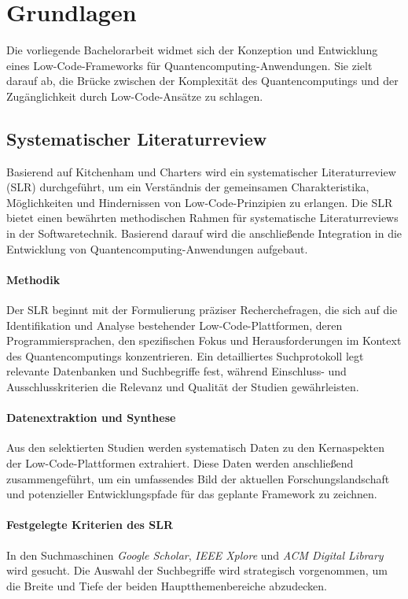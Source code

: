 \section{Grundlagen}
Die vorliegende Bachelorarbeit widmet sich der Konzeption und Entwicklung eines 
Low-Code-Frameworks für Quantencomputing-Anwendungen. Sie zielt darauf ab, die 
Brücke zwischen der Komplexität des Quantencomputings und der Zugänglichkeit durch 
Low-Code-Ansätze zu schlagen. 

\subsection{Systematischer Literaturreview}
Basierend auf Kitchenham und Charters \cite{kitchenham2007guidelines} wird ein systematischer 
Literaturreview (SLR) durchgeführt, um ein Verständnis der gemeinsamen Charakteristika, Möglichkeiten 
und Hindernissen von Low-Code-Prinzipien zu erlangen. Die SLR bietet einen bewährten methodischen 
Rahmen für systematische Literaturreviews in der Softwaretechnik. Basierend darauf wird die 
anschließende Integration in die Entwicklung von Quantencomputing-Anwendungen aufgebaut.

\paragraph{Methodik}
Der SLR beginnt mit der Formulierung präziser Recherchefragen, die sich auf die 
Identifikation und Analyse bestehender Low-Code-Plattformen, deren Programmiersprachen, 
den spezifischen Fokus und Herausforderungen im Kontext des Quantencomputings 
konzentrieren. Ein detailliertes Suchprotokoll legt relevante Datenbanken und 
Suchbegriffe fest, während Einschluss- und Ausschlusskriterien die Relevanz und Qualität 
der Studien gewährleisten.

\paragraph{Datenextraktion und Synthese}
Aus den selektierten Studien werden systematisch Daten zu den Kernaspekten der 
Low-Code-Plattformen extrahiert. Diese Daten werden anschließend zusammengeführt, um ein 
umfassendes Bild der aktuellen Forschungslandschaft und potenzieller Entwicklungspfade für 
das geplante Framework zu zeichnen.

\paragraph{Festgelegte Kriterien des SLR}
In den Suchmaschinen \textit{Google Scholar}, \textit{IEEE Xplore} und \textit{ACM Digital Library} 
wird gesucht. Die Auswahl der Suchbegriffe wird strategisch vorgenommen, um die Breite und Tiefe der beiden 
Hauptthemenbereiche abzudecken. 

